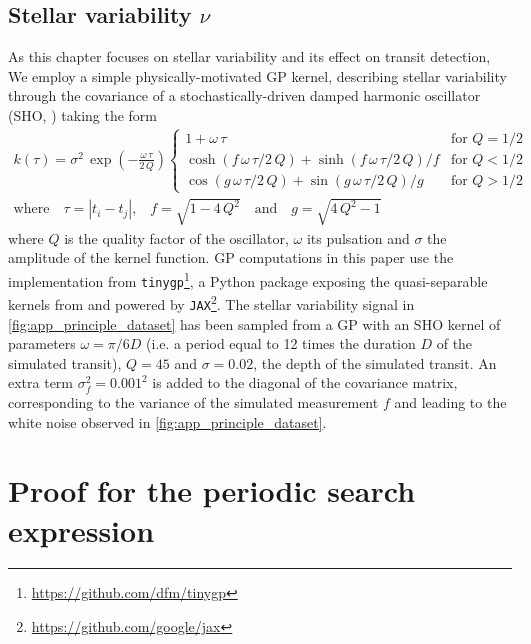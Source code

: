 \documentclass[modern]{aastex631}
\begin{document}
\subsection{Stellar variability $\nu$}\label{app_gp}
As this chapter focuses on stellar variability and its effect on transit detection, We employ a simple physically-motivated GP kernel, describing stellar variability through the covariance of a stochastically-driven damped harmonic oscillator (SHO, \citealt{celerite, celerite2}) taking the form 
\begin{equation}
    \begin{gathered}
        k(\tau) = \sigma^2\,\exp\left(-\frac{\omega\,\tau}{2\,Q}\right)
        \left\{\begin{array}{ll}
            1 + \omega\,\tau & \mbox{for } Q = 1/2 \\
            \cosh(f\,\omega\,\tau/2\,Q) + \sinh(f\,\omega\,\tau/2\,Q)/f
                & \mbox{for } Q < 1/2 \\
            \cos(g\,\omega\,\tau/2\,Q) + \sin(g\,\omega\,\tau/2\,Q)/g
                & \mbox{for } Q > 1/2
        \end{array}\right. \\
        \text{where}\quad \tau = |t_i - t_j|\text{,}\quad f = \sqrt{1 - 4\,Q^2} \quad \text{and}\quad g = \sqrt{4\,Q^2 - 1}
    \end{gathered}
\end{equation}
where $Q$ is the quality factor of the oscillator, $\omega$ its pulsation and $\sigma$ the amplitude of the kernel function. GP computations in this paper use the implementation from \texttt{tinygp}\footnote{\href{https://github.com/dfm/tinygp}{https://github.com/dfm/tinygp}}, a Python package exposing the quasi-separable kernels from \cite{celerite2} and powered by \texttt{JAX}\footnote{\href{https://github.com/google/jax}{https://github.com/google/jax}}. The stellar variability signal in \autoref{fig:app_principle_dataset} has been sampled from a GP with an SHO kernel of parameters $\omega = \pi/6D$ (i.e. a period equal to 12 times the duration $D$ of the simulated transit), $Q=45$ and $\sigma=0.02$, the depth of the simulated transit. An extra term $\sigma_f^2=0.001^2$ is added to the diagonal of the covariance matrix, corresponding to the variance of the simulated measurement $f$ and leading to the white noise observed in \autoref{fig:app_principle_dataset}.

\section{Proof for the periodic search expression}\label{proof}
\end{document}
